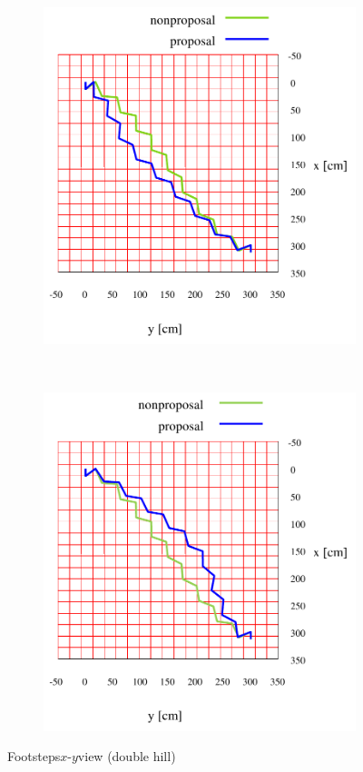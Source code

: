 \documentclass[autodetect-engine,dvipdfmx-if-dvi,ja=standard,a4j,jbase=11pt,magstyle=nomag*]{bxjsreport}
\begin{document}
\begin{figure}[pt]%
    \centering%
    \begin{subfigure}[c]{\linewidth}
        \centering%
        \includegraphics[width=0.55\linewidth, clip]{./figure/sim_hrp2_hill2_100_0_xy.pdf}%
        \label{fig:sim_hrp2_hill2_100_0_xy}%
    \end{subfigure}\\ %
    \begin{subfigure}[c]{\linewidth}
        \centering%
        \includegraphics[width=0.55\linewidth, clip]{./figure/sim_hrp2_hill2_100_2_xy.pdf}%
        \label{fig:sim_hrp2_hill2_100_2_xy}%
    \end{subfigure}%
    \caption{Footsteps$x$-$y$view (double hill)}%
    \label{fig:sim_hrp2_hill2_xy}%
\end{figure}
\end{document}
